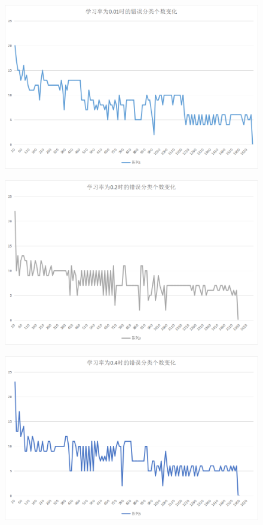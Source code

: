 \documentclass[10pt,a4paper]{ctexart}
\begin{document}
  \begin{figure}[htbp]
  \centering
  \includegraphics[width=1\textwidth]{0.01.png}
  \end{figure}
    \begin{figure}[htbp]
  \centering
  \includegraphics[width=1\textwidth]{0.2.png}
    \end{figure}
    \begin{figure}[htbp]
  \centering
  \includegraphics[width=1\textwidth]{0.4.png}
    \end{figure}
\end{document}
